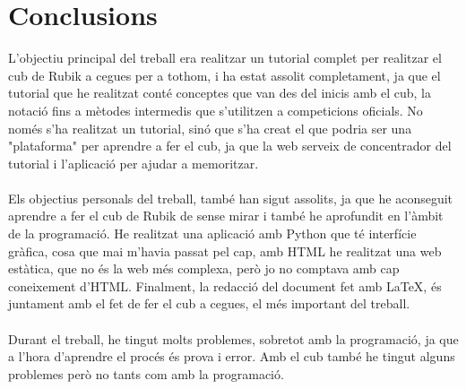 \pagestyle{conclusions}
\part*{Conclusions}

L'objectiu principal del treball era realitzar un tutorial complet per realitzar el cub de Rubik
a cegues per a tothom, i ha estat assolit completament, ja que el tutorial que he realitzat conté
conceptes que van des del inicis amb el cub, la notació fins a mètodes intermedis que s'utilitzen
a competicions oficials. No només s'ha realitzat un tutorial, sinó que s'ha creat el que podria ser
una "plataforma" per aprendre a fer el cub, ja que la web serveix de concentrador del tutorial i
l'aplicació per ajudar a memoritzar.
\\\\Els objectius personals del treball, també han sigut assolits, ja que he aconseguit aprendre
a fer el cub de Rubik de sense mirar i també he aprofundit en l'àmbit de la programació. He
realitzat una aplicació amb Python que té interfície gràfica, cosa que mai m'havia passat
pel cap, amb HTML he realitzat una web estàtica, que no és la web més complexa, però jo no
comptava amb cap coneixement d'HTML. Finalment, la redacció del document fet amb LaTeX,
és juntament amb el fet de fer el cub a cegues, el més important del treball. 
\\\\Durant el treball, he tingut molts problemes, sobretot amb la programació, ja que a l'hora d'aprendre el procés és prova i error. Amb el cub també he tingut alguns problemes però no tants com amb la programació.
